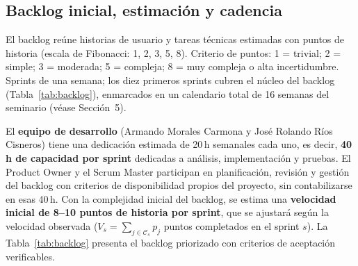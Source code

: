 \documentclass[11pt,a4paper]{article}
\begin{document}
\subsection{Backlog inicial, estimación y cadencia}
El backlog reúne historias de usuario y tareas técnicas estimadas con puntos de historia (escala de Fibonacci: 1, 2, 3, 5, 8). Criterio de puntos: 1 = trivial; 2 = simple; 3 = moderada; 5 = compleja; 8 = muy compleja o alta incertidumbre. Sprints de una semana; los diez primeros sprints cubren el núcleo del backlog (Tabla~\ref{tab:backlog}), enmarcados en un calendario total de 16 semanas del seminario (véase Sección~5).

El \textbf{equipo de desarrollo} (Armando Morales Carmona y José Rolando Ríos Cisneros) tiene una dedicación estimada de 20\,h semanales cada uno, es decir, \textbf{40\,h de capacidad por sprint} dedicadas a análisis, implementación y pruebas. El Product Owner y el Scrum Master participan en planificación, revisión y gestión del backlog con criterios de disponibilidad propios del proyecto, sin contabilizarse en esas 40\,h. Con la complejidad inicial del backlog, se estima una \textbf{velocidad inicial de 8--10 puntos de historia por sprint}, que se ajustará según la velocidad observada ($V_s = \sum_{j \in \mathcal{C}_s} p_j$ puntos completados en el sprint $s$). La Tabla~\ref{tab:backlog} presenta el backlog priorizado con criterios de aceptación verificables.
\end{document}
